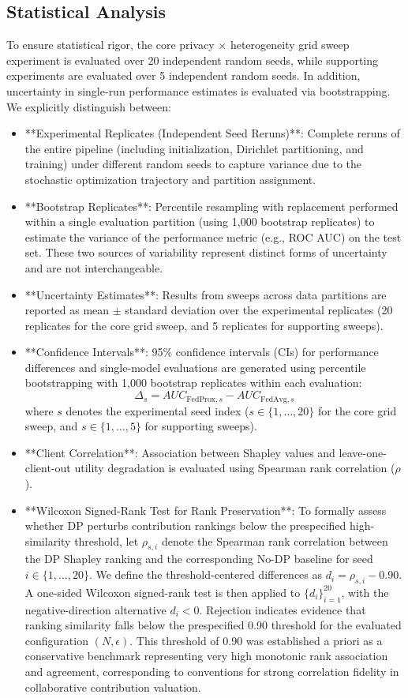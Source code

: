 \documentclass[conference]{IEEEtran}
\begin{document}
\subsection{Statistical Analysis}
To ensure statistical rigor, the core privacy $\times$ heterogeneity grid sweep experiment is evaluated over 20 independent random seeds, while supporting experiments are evaluated over 5 independent random seeds. In addition, uncertainty in single-run performance estimates is evaluated via bootstrapping. We explicitly distinguish between:
\begin{itemize}
    \item **Experimental Replicates (Independent Seed Reruns)**: Complete reruns of the entire pipeline (including initialization, Dirichlet partitioning, and training) under different random seeds to capture variance due to the stochastic optimization trajectory and partition assignment.
    \item **Bootstrap Replicates**: Percentile resampling with replacement performed within a single evaluation partition (using 1,000 bootstrap replicates) to estimate the variance of the performance metric (e.g., ROC AUC) on the test set. These two sources of variability represent distinct forms of uncertainty and are not interchangeable.
    \item **Uncertainty Estimates**: Results from sweeps across data partitions are reported as mean $\pm$ standard deviation over the experimental replicates (20 replicates for the core grid sweep, and 5 replicates for supporting sweeps).
    \item **Confidence Intervals**: 95\% confidence intervals (CIs) for performance differences and single-model evaluations are generated using percentile bootstrapping with 1,000 bootstrap replicates within each evaluation:
    \begin{equation}
    \Delta_s = AUC_{\mathrm{FedProx}, s} - AUC_{\mathrm{FedAvg}, s}
    \end{equation}
    where $s$ denotes the experimental seed index ($s \in \{1, \dots, 20\}$ for the core grid sweep, and $s \in \{1, \dots, 5\}$ for supporting sweeps).
    \item **Client Correlation**: Association between Shapley values and leave-one-client-out utility degradation is evaluated using Spearman rank correlation ($\rho$).
    \item **Wilcoxon Signed-Rank Test for Rank Preservation**: To formally assess whether DP perturbs contribution rankings below the prespecified high-similarity threshold, let $\rho_{s,i}$ denote the Spearman rank correlation between the DP Shapley ranking and the corresponding No-DP baseline for seed $i \in \{1, \dots, 20\}$. We define the threshold-centered differences as $d_i = \rho_{s,i} - 0.90$. A one-sided Wilcoxon signed-rank test is then applied to $\{d_i\}_{i=1}^{20}$, with the negative-direction alternative $d_i < 0$. Rejection indicates evidence that ranking similarity falls below the prespecified 0.90 threshold for the evaluated configuration $(N, \epsilon)$. This threshold of 0.90 was established a priori as a conservative benchmark representing very high monotonic rank association and agreement, corresponding to conventions for strong correlation fidelity in collaborative contribution valuation.

\end{itemize}
\end{document}
